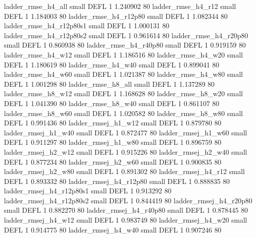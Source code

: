       ladder_rmse_h4_all      small     DEFL                 1 1.240902 80
      ladder_rmse_h4_r12      small     DEFL                 1 1.184003 80
   ladder_rmse_h4_r12p80      small     DEFL                 1 1.082344 80
 ladder_rmse_h4_r12p80s1      small     DEFL                 1 1.000131 80
 ladder_rmse_h4_r12p80s2      small     DEFL                 1 0.961614 80
   ladder_rmse_h4_r20p80      small     DEFL                 1 0.860938 80
   ladder_rmse_h4_r40p80      small     DEFL                 1 0.919159 80
      ladder_rmse_h4_w12      small     DEFL                 1 1.186516 80
      ladder_rmse_h4_w20      small     DEFL                 1 1.180619 80
      ladder_rmse_h4_w40      small     DEFL                 1 0.899041 80
      ladder_rmse_h4_w60      small     DEFL                 1 1.021387 80
      ladder_rmse_h4_w80      small     DEFL                 1 1.001298 80
      ladder_rmse_h8_all      small     DEFL                 1 1.137289 80
      ladder_rmse_h8_w12      small     DEFL                 1 1.168628 80
      ladder_rmse_h8_w20      small     DEFL                 1 1.041390 80
      ladder_rmse_h8_w40      small     DEFL                 1 0.861107 80
      ladder_rmse_h8_w60      small     DEFL                 1 1.020582 80
      ladder_rmse_h8_w80      small     DEFL                 1 0.991436 80
     ladder_rmsej_h1_w12      small     DEFL                 1 0.879780 80
     ladder_rmsej_h1_w40      small     DEFL                 1 0.872477 80
     ladder_rmsej_h1_w60      small     DEFL                 1 0.911297 80
     ladder_rmsej_h1_w80      small     DEFL                 1 0.896759 80
     ladder_rmsej_h2_w12      small     DEFL                 1 0.915226 80
     ladder_rmsej_h2_w40      small     DEFL                 1 0.877234 80
     ladder_rmsej_h2_w60      small     DEFL                 1 0.900835 80
     ladder_rmsej_h2_w80      small     DEFL                 1 0.891302 80
     ladder_rmsej_h4_r12      small     DEFL                 1 0.893332 80
  ladder_rmsej_h4_r12p80      small     DEFL                 1 0.888835 80
ladder_rmsej_h4_r12p80s1      small     DEFL                 1 0.913292 80
ladder_rmsej_h4_r12p80s2      small     DEFL                 1 0.844419 80
  ladder_rmsej_h4_r20p80      small     DEFL                 1 0.882270 80
  ladder_rmsej_h4_r40p80      small     DEFL                 1 0.878445 80
     ladder_rmsej_h4_w12      small     DEFL                 1 0.983749 80
     ladder_rmsej_h4_w20      small     DEFL                 1 0.914775 80
     ladder_rmsej_h4_w40      small     DEFL                 1 0.907246 80
